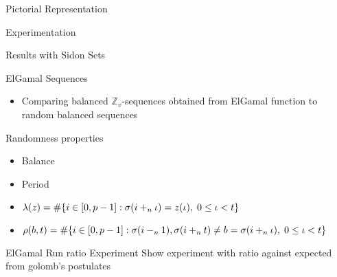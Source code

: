\begin{frame}{Pictorial Representation}
\end{frame}

\begin{frame}{Experimentation}
\end{frame}

\begin{frame}{Results with Sidon Sets}
\end{frame}

\begin{frame}{ElGamal Sequences}
    \begin{itemize}
        \item Comparing balanced $\mathbb{Z}_v$-sequences obtained from ElGamal function to random balanced sequences~\cite{elgamalsequences}
    \end{itemize}
\end{frame}

\begin{frame}{Randomness properties}
  \begin{itemize}
  \item Balance
  \item Period
  \item   $\lambda(z) = \#{\{i \in [0,p-1]: \sigma(i+_{n} \iota) = z(\iota),\; 0 \leq \iota < t\}}$
    \item  $\rho(b,t) = \#{ \{i \in [0,p-1]: \sigma(i-_{n} 1),\sigma(i+_n t) \neq b = \sigma(i+_n\iota),\; 0 \leq \iota < t\}}$
    \end{itemize}
  
  \end{frame}


\begin{frame}{ElGamal Run ratio Experiment}
    Show experiment with ratio against expected from golomb's postulates
\end{frame}



 	

